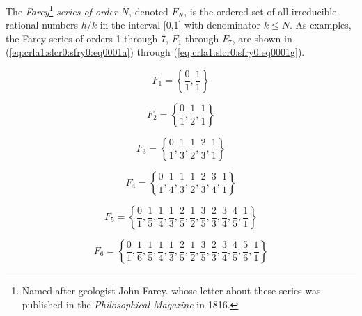 \label{crla1:slcr0:sfry0}

The \emph{Farey}\footnote{Named after geologist John Farey. whose letter about 
these series was published in the \emph{Philosophical Magazine} in 1816.} \emph{series
of order $N$}, denoted $F_{N}$,
is the ordered set of all irreducible
rational numbers $h/k$ in the interval
[0,1]
with denominator $k\leq N$.
As examples, the Farey series of
orders 1 through 7, $F_1$ through $F_7$, are shown
in (\ref{eq:crla1:slcr0:sfry0:eq0001a}) through (\ref{eq:crla1:slcr0:sfry0:eq0001g}).

\begin{equation}
\label{eq:crla1:slcr0:sfry0:eq0001a}
F_1  = \left\{ {\frac{0}{1},\frac{1}{1}} \right\}
\end{equation}

\begin{equation}
\label{eq:crla1:slcr0:sfry0:eq0001b}
F_2  = \left\{ {\frac{0}{1},\frac{1}{2},\frac{1}{1}} \right\}
\end{equation}

\begin{equation}
\label{eq:crla1:slcr0:sfry0:eq0001c}
F_3  = \left\{ {\frac{0}{1},\frac{1}{3},\frac{1}{2},
                \frac{2}{3},\frac{1}{1}} \right\}
\end{equation}

\begin{equation}
\label{eq:crla1:slcr0:sfry0:eq0001d}
F_4  = \left\{ {\frac{0}{1},\frac{1}{4},
                \frac{1}{3},\frac{1}{2},
                \frac{2}{3},\frac{3}{4},
                \frac{1}{1}} \right\}
\end{equation}

\begin{equation}
\label{eq:crla1:slcr0:sfry0:eq0001e}
F_5  = \left\{ {\frac{0}{1},\frac{1}{5},\frac{1}{4},
                \frac{1}{3},\frac{2}{5},\frac{1}{2},
                \frac{3}{5},\frac{2}{3},\frac{3}{4},
                \frac{4}{5},\frac{1}{1}} \right\}
\end{equation}

\begin{equation}
\label{eq:crla1:slcr0:sfry0:eq0001f}
F_6  = \left\{ {\frac{0}{1},\frac{1}{6},\frac{1}{5},
                \frac{1}{4},
                \frac{1}{3},\frac{2}{5},\frac{1}{2},
                \frac{3}{5},\frac{2}{3},
                \frac{3}{4},
                \frac{4}{5},
                \frac{5}{6},\frac{1}{1}} \right\}
\end{equation}


